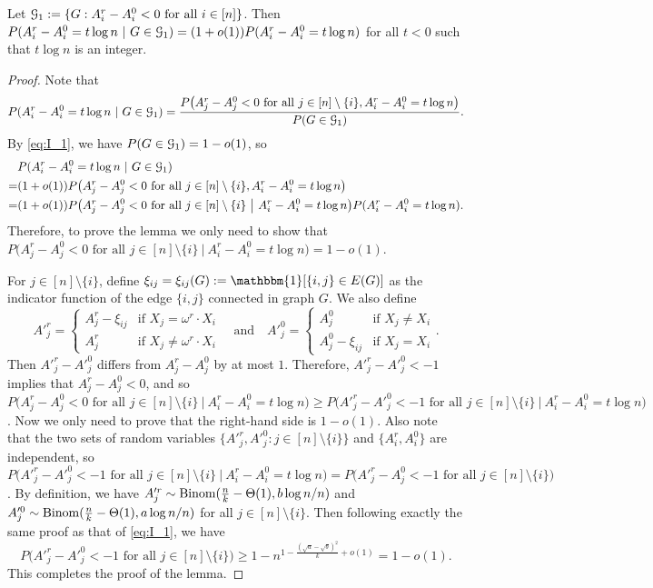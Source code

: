 \documentclass{article}
\begin{document}
\begin{lemma}  \label{lm:5t}
Let $\mathcal{G}_1:=\{G:A^r_i-A^0_i<0\text{~for all~}i\in[n]\}$.
Then $P(A^r_i-A^0_i= t\log n~|~G\in\mathcal{G}_1)= (1+o(1))P(A^r_i-A^0_i= t\log n)$ for all $t<0$ such that $t\log n$ is an integer.
\end{lemma}

\begin{proof}
Note that 
$$
P(A^r_i-A^0_i= t\log n~|~G\in\mathcal{G}_1)
=\frac{P \big(A^r_j-A^0_j<0\text{~for all~} j\in[n]\setminus\{i\}, A^r_i-A^0_i= t\log n \big)}{P(G\in\mathcal{G}_1)} .
$$
By \eqref{eq:I_1}, we have $P(G\in\mathcal{G}_1)=1-o(1)$, so
\begin{align*}
& P(A^r_i-A^0_i= t\log n~|~G\in\mathcal{G}_1) \\
= & (1+o(1)) P \big(A^r_j-A^0_j<0\text{~for all~} j\in[n]\setminus\{i\}, A^r_i-A^0_i= t\log n \big) \\
= & (1+o(1)) P \big(A^r_j-A^0_j<0\text{~for all~} j\in[n]\setminus\{i\} ~\big|~ A^r_i-A^0_i= t\log n \big) P(A^r_i-A^0_i= t\log n) .
\end{align*}
Therefore, to prove the lemma we only need to show that $P \big(A^r_j-A^0_j<0\text{~for all~} j\in[n]\setminus\{i\} ~\big|~ A^r_i-A^0_i= t\log n \big)=1-o(1)$. 

For $j\in[n]\setminus\{i\}$, define $\xi_{ij}=\xi_{ij}(G):=\mathbbm{1}[\{i,j\}\in E(G)]$ as the indicator function of the edge $\{i,j\}$ connected in graph $G$. We also define 
$$
A'^r_j=\left\{
\begin{array}{cl}
  A^r_j-\xi_{ij}   & \mbox{if~} X_j = \omega^r \cdot X_i \\
  A^r_j   &   \mbox{if~} X_j \neq \omega^r \cdot X_i
\end{array}
\right.
\quad \text{and} \quad
A'^0_j=\left\{
\begin{array}{cl}
  A^0_j   & \mbox{if~} X_j \neq X_i \\
  A^0_j-\xi_{ij}   &   \mbox{if~} X_j = X_i
\end{array}
\right. .
$$
Then $A'^r_j-A'^0_j$ differs from $A^r_j-A^0_j$ by at most $1$.
Therefore, $A'^r_j-A'^0_j<-1$ implies that $A^r_j-A^0_j<0$,
and so $P \big(A^r_j-A^0_j<0\text{~for all~} j\in[n]\setminus\{i\} ~\big|~ A^r_i-A^0_i= t\log n \big) \ge P \big(A'^r_j-A'^0_j<-1 \text{~for all~} j\in[n]\setminus\{i\} ~\big|~ A^r_i-A^0_i= t\log n \big)$.
Now we only need to prove that the right-hand side is $1-o(1)$.
Also note that the two sets of random variables $\{A'^r_j,A'^0_j:j\in[n]\setminus\{i\}\}$ and $\{A^r_i,A^0_i\}$ are independent,
so $P \big(A'^r_j-A'^0_j<-1 \text{~for all~} j\in[n]\setminus\{i\} ~\big|~ A^r_i-A^0_i= t\log n \big)=P \big(A'^r_j-A^0_j<-1 \text{~for all~} j\in[n]\setminus\{i\}  \big)$.
By definition, we have
$A'^r_j\sim\operatorname{Binom}(\frac{n}{k}-\Theta(1),b\log n/n)$
and $A'^0_j\sim\operatorname{Binom}(\frac{n}{k}-\Theta(1),a\log n/n)$ for all $j\in[n]\setminus\{i\}$.
Then following exactly the same proof as that of \eqref{eq:I_1}, we have
$$
P \big(A'^r_j-A'^0_j <-1 \text{~for all~} j\in[n]\setminus\{i\}  \big)
\ge 1- n^{1-\frac{(\sqrt{a}-\sqrt{b})^2}{k} +o(1)} = 1-o(1).
$$
This completes the proof of the lemma.
\end{proof}
\end{document}

